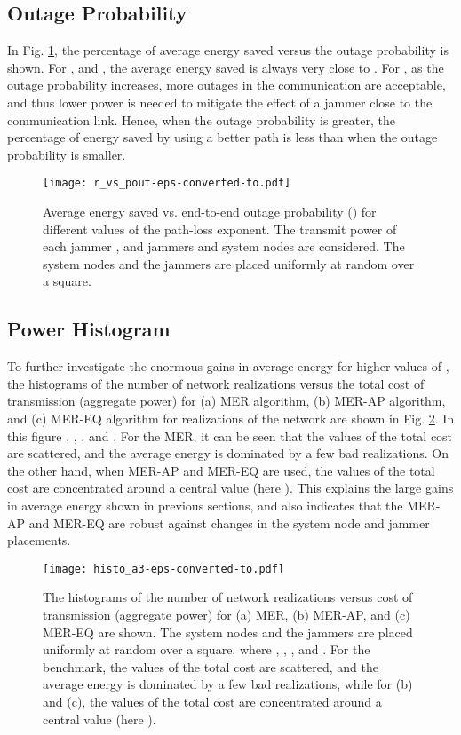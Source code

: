 \documentclass[10pt,journal]{IEEEtran}
\theoremstyle{definition}
\begin{document}
\subsection{Outage Probability}
In Fig. \ref{fig:r_vs_pout}, the percentage of average energy saved versus the outage probability is shown. For , and , the average energy saved is always very close to . For , as the outage probability increases, more outages in the communication are acceptable,  and thus lower power is needed to mitigate the effect of a jammer close to the communication link. 
Hence, when the outage probability is greater, the percentage of energy saved by using a better path is less than when the outage probability is smaller.

\begin{figure}
\begin{center}
 \texttt{[image: r\_vs\_pout-eps-converted-to.pdf]}
 \end{center}
 \vspace{-.1 in}
 \caption{Average energy saved vs. end-to-end outage probability () for different values of the path-loss exponent. The transmit power of each jammer , and  jammers  and  system nodes are considered. The system nodes and the jammers are placed uniformly at random over a  square. }
 \label{fig:r_vs_pout}
 \end{figure}
\subsection{Power Histogram}
To further investigate the enormous gains in average energy for
higher values of , the histograms of the number of network realizations
versus the total cost of transmission (aggregate power) for
(a) MER algorithm, (b) MER-AP  algorithm, and (c) MER-EQ algorithm for  realizations
of the network are shown in Fig. \ref{fig:histo}. In this figure ,
, , and .  For the MER, it can be seen
that the values of the total cost are scattered, and the average
energy is dominated by a few bad realizations.  On the
other hand, when MER-AP and MER-EQ are used, the values of
the total cost are concentrated around a central value (here
). This explains the large gains in average energy shown in
previous sections, and also indicates that the MER-AP and MER-EQ are robust
against changes in the system node and jammer placements.
\begin{figure}
\begin{center}
 \texttt{[image: histo\_a3-eps-converted-to.pdf]}
 \end{center}
 \caption{The histograms of the number of network realizations versus  cost of transmission (aggregate power)  for (a) MER, (b) MER-AP, and (c) MER-EQ  are shown. The system nodes and the jammers are placed uniformly at random over a  square,  where , , , and .
 For the benchmark,  the values of the total cost are scattered, and the average
energy is dominated by a few bad realizations, while for (b) and (c), the values of
the total cost are concentrated around a central value (here
). }
\label{fig:histo}
 \end{figure}
\end{document}
